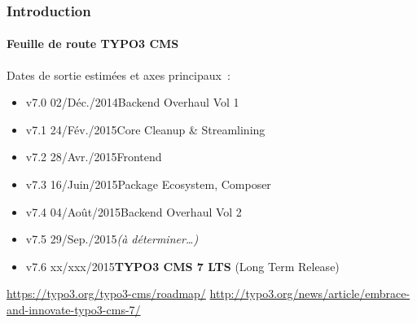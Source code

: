 \begin{frame}[fragile]
	\frametitle{Introduction}
	\framesubtitle{Feuille de route TYPO3 CMS}

	Dates de sortie estimées et axes principaux~:

	\begin{itemize}
		\item v7.0 \tabto{1.0cm}02/Déc./2014\tabto{3.4cm}Backend Overhaul Vol 1
		\item v7.1 \tabto{1.0cm}24/Fév./2015\tabto{3.4cm}Core Cleanup \& Streamlining
		\item v7.2 \tabto{1.0cm}28/Avr./2015\tabto{3.4cm}Frontend
		\item v7.3 \tabto{1.0cm}16/Juin/2015\tabto{3.4cm}Package Ecosystem, Composer
		\item
			\begingroup
				\color{typo3orange}
					v7.4 \tabto{1.0cm}04/Août/2015\tabto{3.4cm}Backend Overhaul Vol 2
			\endgroup

		\item v7.5 \tabto{1.0cm}29/Sep./2015\tabto{3.4cm}\textit{(à déterminer…)}
		\item v7.6 \tabto{1.0cm}xx/xxx/2015\tabto{3.4cm}\textbf{TYPO3 CMS 7 LTS} (Long Term Release)
	\end{itemize}

	\smaller
		\url{https://typo3.org/typo3-cms/roadmap/}\newline
		\url{http://typo3.org/news/article/embrace-and-innovate-typo3-cms-7/}
	\normalsize

\end{frame}

